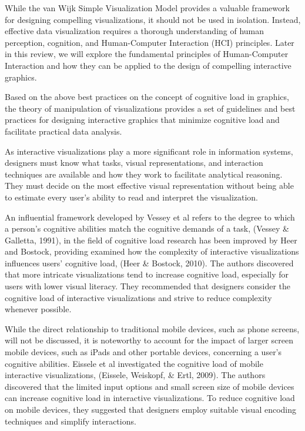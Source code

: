 \documentclass[print]{nuthesis}
\begin{document}
While the van Wijk Simple Visualization Model provides a valuable framework for designing compelling visualizations, it should not be used in isolation.
Instead, effective data visualization requires a thorough understanding of human perception, cognition, and Human-Computer Interaction (HCI) principles.
Later in this review, we will explore the fundamental principles of Human-Computer Interaction and how they can be applied to the design of compelling interactive graphics.

Based on the above best practices on the concept of cognitive load in graphics, the theory of manipulation of visualizations provides a set of guidelines and best practices for designing interactive graphics that minimize cognitive load and facilitate practical data analysis.

As interactive visualizations play a more significant role in information systems, designers must know what tasks, visual representations, and interaction techniques are available and how they work to facilitate analytical reasoning.
They must decide on the most effective visual representation without being able to estimate every user's ability to read and interpret the visualization.

An influential framework developed by Vessey et al refers to the degree to which a person's cognitive abilities match the cognitive demands of a task, (Vessey \& Galletta, 1991), in the field of cognitive load research has been improved by Heer and Bostock, providing examined how the complexity of interactive visualizations influences users' cognitive load, (Heer \& Bostock, 2010).
The authors discovered that more intricate visualizations tend to increase cognitive load, especially for users with lower visual literacy.
They recommended that designers consider the cognitive load of interactive visualizations and strive to reduce complexity whenever possible.

While the direct relationship to traditional mobile devices, such as phone screens, will not be discussed, it is noteworthy to account for the impact of larger screen mobile devices, such as iPads and other portable devices, concerning a user's cognitive abilities.
Eissele et al investigated the cognitive load of mobile interactive visualizations, (Eissele, Weiskopf, \& Ertl, 2009).
The authors discovered that the limited input options and small screen size of mobile devices can increase cognitive load in interactive visualizations.
To reduce cognitive load on mobile devices, they suggested that designers employ suitable visual encoding techniques and simplify interactions.
\end{document}
